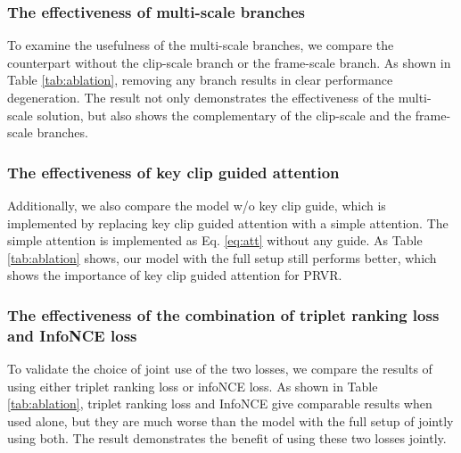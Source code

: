 \documentclass[sigconf]{acmart}
\begin{document}
\begin{table} [tb!]
\renewcommand{\arraystretch}{1.0}
\caption{Ablation study on the TVR dataset. 
}\vspace{-3mm}
\label{tab:ablation}
\centering 
{}\end{table}

\subsubsection{The effectiveness of multi-scale branches}
To examine the usefulness of the multi-scale branches, we compare the counterpart without the clip-scale branch or the frame-scale branch.
As shown in Table \ref{tab:ablation}, removing any branch results in clear performance degeneration. The result not only demonstrates the effectiveness of the multi-scale solution, but also shows the complementary of the clip-scale and the frame-scale branches.

\subsubsection{The effectiveness of key clip guided attention}
Additionally, we also compare the model w/o key clip guide, which is implemented by replacing key clip guided attention with a simple attention. The simple attention is implemented as Eq. \ref{eq:att} without any guide. 
As Table \ref{tab:ablation} shows, our model with the full setup still performs better, which shows the importance of key clip guided attention for PRVR.

\subsubsection{The effectiveness of the combination of triplet ranking loss and InfoNCE loss}
To validate the choice of joint use of the two losses, we compare the results of using either triplet ranking loss or infoNCE loss. As shown in Table \ref{tab:ablation}, triplet ranking loss and InfoNCE give comparable results when used alone, but they are much worse than the model with the full setup of jointly using both. 
The result demonstrates the benefit of using these two losses jointly.
\end{document}
